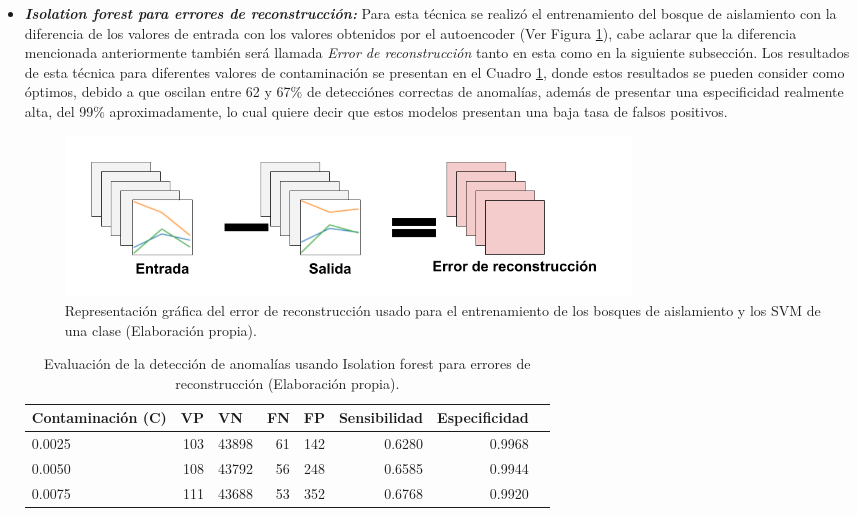 \begin{itemize}
\item \textbf{\textit{Isolation forest para errores de reconstrucci\'{o}n: }}Para esta t\'{e}cnica se realiz\'{o} el entrenamiento del bosque de aislamiento con la diferencia de los valores de entrada con los valores obtenidos por el autoencoder (Ver Figura \ref{fig:error}), cabe aclarar que la diferencia mencionada anteriormente tambi\'{e}n ser\'{a} llamada \textit{Error de reconstrucci\'{o}n} tanto en esta como en la siguiente subsecci\'{o}n. Los resultados de esta t\'{e}cnica para diferentes valores de contaminaci\'{o}n se presentan en el Cuadro \ref{table:evaluacion_IF_errores_reconstruccion}, donde estos resultados se pueden consider como \'{o}ptimos, debido a que oscilan entre 62 y 67\% de detecci\'{o}nes correctas de anomal\'{i}as, adem\'{a}s de presentar una especificidad realmente alta, del 99\% aproximadamente, lo cual quiere decir que estos modelos presentan una baja tasa de falsos positivos. 

\begin{figure}[H]
        \centering
            \includegraphics[width=0.75\textwidth, frame]{imagenes/Cap5/error}
        \caption{Representaci\'{o}n gr\'{a}fica del error de reconstrucci\'{o}n usado para el entrenamiento de los bosques de aislamiento y los SVM de una clase (Elaboraci\'{o}n propia).}
		\label{fig:error}
\end{figure}

\begin{table}[H]
\centering
\begin{center}
\begin{tabular}{|l|r|r|r|r|r|r|r|}
\hline
\textbf{Contaminaci\'{o}n (C)} & \multicolumn{1}{l|}{\textbf{VP}} & \multicolumn{1}{l|}{\textbf{VN}}& \multicolumn{1}{l|}{\textbf{FN}}& \multicolumn{1}{l|}{\textbf{FP}} & \multicolumn{1}{l|}{\textbf{Sensibilidad}} & \multicolumn{1}{l|}{\textbf{Especificidad}} \\ \hline
0.0025 & \cellcolor[HTML]{AADD99} 103 & \cellcolor[HTML]{AADD99} 43898 & \cellcolor[HTML]{FFCE93} 61 & \cellcolor[HTML]{FFCE93} 142 & 0.6280 & 0.9968 \\ \hline
0.0050 & \cellcolor[HTML]{AADD99} 108 & \cellcolor[HTML]{AADD99} 43792 & \cellcolor[HTML]{FFCE93} 56 & \cellcolor[HTML]{FFCE93} 248 & 0.6585 & 0.9944 \\ \hline
0.0075 & \cellcolor[HTML]{AADD99} 111 & \cellcolor[HTML]{AADD99} 43688 & \cellcolor[HTML]{FFCE93} 53 & \cellcolor[HTML]{FFCE93} 352 & 0.6768 & 0.9920 \\ \hline
\end{tabular}
\end{center}
\caption{Evaluaci\'{o}n de la detecci\'{o}n de anomal\'{i}as usando Isolation forest para errores de reconstrucci\'{o}n (Elaboraci\'{o}n propia).}
\label{table:evaluacion_IF_errores_reconstruccion}
\end{table}
\end{itemize}

